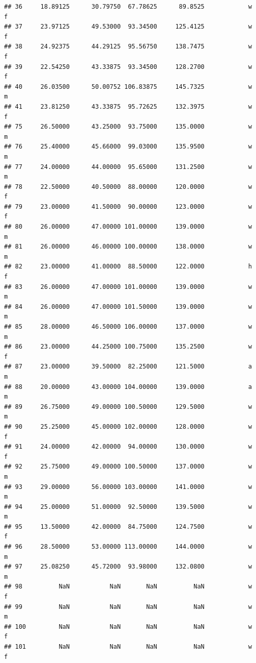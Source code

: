 \documentclass[]{article}
\begin{document}
\begin{verbatim}
## 36     18.89125      30.79750  67.78625      89.8525            w         f
## 37     23.97125      49.53000  93.34500     125.4125            w         f
## 38     24.92375      44.29125  95.56750     138.7475            w         f
## 39     22.54250      43.33875  93.34500     128.2700            w         f
## 40     26.03500      50.00752 106.83875     145.7325            w         m
## 41     23.81250      43.33875  95.72625     132.3975            w         f
## 75     26.50000      43.25000  93.75000     135.0000            w         m
## 76     25.40000      45.66000  99.03000     135.9500            w         m
## 77     24.00000      44.00000  95.65000     131.2500            w         m
## 78     22.50000      40.50000  88.00000     120.0000            w         f
## 79     23.00000      41.50000  90.00000     123.0000            w         f
## 80     26.00000      47.00000 101.00000     139.0000            w         m
## 81     26.00000      46.00000 100.00000     138.0000            w         m
## 82     23.00000      41.00000  88.50000     122.0000            h         f
## 83     26.00000      47.00000 101.00000     139.0000            w         m
## 84     26.00000      47.00000 101.50000     139.0000            w         m
## 85     28.00000      46.50000 106.00000     137.0000            w         m
## 86     23.00000      44.25000 100.75000     135.2500            w         f
## 87     23.00000      39.50000  82.25000     121.5000            a         m
## 88     20.00000      43.00000 104.00000     139.0000            a         m
## 89     26.75000      49.00000 100.50000     129.5000            w         m
## 90     25.25000      45.00000 102.00000     128.0000            w         f
## 91     24.00000      42.00000  94.00000     130.0000            w         f
## 92     25.75000      49.00000 100.50000     137.0000            w         m
## 93     29.00000      56.00000 103.00000     141.0000            w         m
## 94     25.00000      51.00000  92.50000     139.5000            w         m
## 95     13.50000      42.00000  84.75000     124.7500            w         f
## 96     28.50000      53.00000 113.00000     144.0000            w         m
## 97     25.08250      45.72000  93.98000     132.0800            w         m
## 98          NaN           NaN       NaN          NaN            w         f
## 99          NaN           NaN       NaN          NaN            w         m
## 100         NaN           NaN       NaN          NaN            w         f
## 101         NaN           NaN       NaN          NaN            w         f

\end{verbatim}
\end{document}
